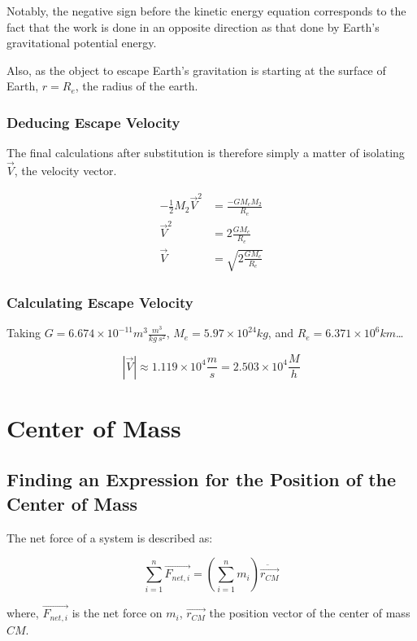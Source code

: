 \documentclass[letterpaper]{article}
\begin{document}
Notably, the negative sign before the kinetic energy equation corresponds to the fact that the work is done in an opposite direction as that done by Earth's gravitational potential energy.

Also, as the object to escape Earth's gravitation is starting at the surface of Earth, \(r = R_e\), the radius of the earth.

\subsubsection{Deducing Escape Velocity}
\label{sec:org276cafb}
The final calculations after substitution is therefore simply a matter of isolating \(\vec{V}\), the velocity vector.

\begin{align}
-\frac{1}{2}M_2 \vec{V}^2 &= \frac{-GM_eM_2}{R_e} \\
\vec{V}^2 &= 2\frac{GM_e}{R_e} \\
\vec{V} &= \sqrt{2\frac{GM_e}{R_e}} 
\end{align}

\subsubsection{Calculating Escape Velocity}
\label{sec:orgcdad97b}
Taking \(G = 6.674 \times 10^{-11} m^3 \frac{m^3}{kg\ s^2}\), \(M_e = 5.97 \times 10^{24} kg\), and \(R_e = 6.371 \times 10^6 km\)\ldots{}

\begin{equation}
|\vec{V}| \approx 1.119 \times 10^4 \frac{m}{s} = 2.503 \times 10^4 \frac{M}{h}
\end{equation}

\section{Center of Mass}
\label{sec:org70d1a0a}

\subsection{Finding an Expression for the Position of the Center of Mass}
\label{sec:org348a133}
The net force of a system is described as:

\begin{equation}
\sum^n_{i=1} \vec{F_{net,i}} = (\sum^n_{i=1} m_i) \ddot{\vec{r_{CM}}}
\end{equation}

where, \(\vec{F_{net,i}}\) is the net force on \(m_i\), \(\vec{r_{CM}}\) the position vector of the center of mass \(CM\).
\end{document}
